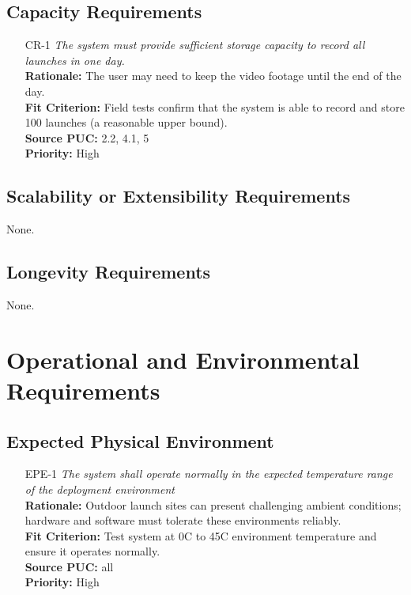 \documentclass[12pt]{article}
\begin{document}
\subsection{Capacity Requirements}
\begin{itemize}[leftmargin=*]
  \item[CR-1] \emph{The system must provide sufficient storage capacity to record all
          launches in one day.}\\[2mm]
        \textbf{Rationale:} The user may need to keep the video footage until the end of the day.\\
        \textbf{Fit Criterion:} Field tests confirm that the system is able to record and store 100 launches (a reasonable upper bound).\\
        \textbf{Source PUC:} 2.2, 4.1, 5 \\
        \textbf{Priority:} High
\end{itemize}

\subsection{Scalability or Extensibility Requirements}

None.

\subsection{Longevity Requirements}

None.

\section{Operational and Environmental Requirements}
\subsection{Expected Physical Environment}
\begin{itemize}[leftmargin=*]
  \item[EPE-1] \emph{The system shall operate normally in the expected temperature
          range of the deployment environment}\\[2mm]
        \textbf{Rationale:} Outdoor launch sites can present challenging ambient conditions; hardware and software must tolerate these environments reliably.\\
        \textbf{Fit Criterion:} Test system at 0C to 45C environment temperature and ensure it operates normally.\\
        \textbf{Source PUC:} all \\
        \textbf{Priority:} High
\end{itemize}
\end{document}
